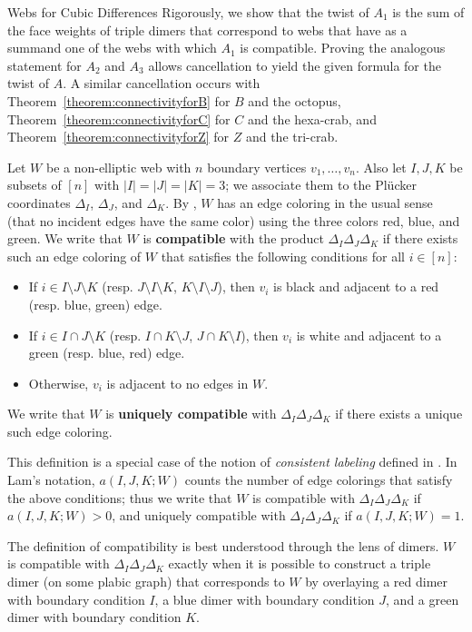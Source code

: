 \begin{subsection}{Webs for Cubic Differences}
Rigorously, we show that the twist of $A_1$ is the sum of the face weights of triple dimers that correspond to webs that have as a summand one of the webs with which $A_1$ is compatible. Proving the analogous statement for $A_2$ and $A_3$ allows cancellation to yield the given formula for the twist of $A$. A similar cancellation occurs with Theorem~\ref{theorem:connectivityforB} for $B$ and the octopus, Theorem~\ref{theorem:connectivityforC} for $C$ and the hexa-crab, and Theorem~\ref{theorem:connectivityforZ} for $Z$ and the tri-crab.

\begin{defi}
Let $W$ be a non-elliptic web with $n$ boundary vertices $v_1,\dots, v_n$. Also let $I,J,K$ be subsets of $[n]$ with $|I|=|J|=|K|=3$; we associate them to the Pl{\"u}cker coordinates $\Delta_I$, $\Delta_J$, and $\Delta_K$. By \cite[Lemma~4.11]{lam2015}, $W$ has an edge coloring in the usual sense (that no incident edges have the same color) using the three colors red, blue, and green. We write that $W$ is \textbf{compatible} with the product $\Delta_I\Delta_J\Delta_K$ if there exists such an edge coloring of $W$ that satisfies the following conditions for all $i \in [n]$:
\begin{itemize}
    \item If $i \in I\setminus J \setminus K$ (resp. $J\setminus I \setminus K$, $K\setminus I \setminus J$), then $v_i$ is black and adjacent to a red (resp. blue, green) edge.
    \item If $i \in I\cap J \setminus K$ (resp. $I\cap K \setminus J$, $J\cap K \setminus I$), then $v_i$ is white and adjacent to a green (resp. blue, red) edge.
    \item Otherwise, $v_i$ is adjacent to no edges in $W$.
\end{itemize}
We write that $W$ is \textbf{uniquely compatible} with $\Delta_I\Delta_J\Delta_K$ if there exists a unique such edge coloring. 
\end{defi}
\begin{rema}\label{rmk:aIJK}
This definition is a special case of the notion of \textit{consistent labeling} defined in \cite[Section 4.5]{lam2015}. In Lam's notation, $a(I,J,K;W)$ counts the number of edge colorings that satisfy the above conditions; thus we write that $W$ is compatible with $\Delta_I\Delta_J\Delta_K$ if $a(I,J,K;W) >0$, and uniquely compatible with $\Delta_I\Delta_J\Delta_K$ if $a(I,J,K;W) =1$.
\end{rema}
\begin{rema}
The definition of compatibility is best understood through the lens of dimers. $W$ is compatible with $\Delta_I\Delta_J\Delta_K$ exactly when it is possible to construct a triple dimer (on some plabic graph) that corresponds to $W$ by overlaying a red dimer with boundary condition $I$, a blue dimer with boundary condition $J$, and a green dimer with boundary condition $K$.
\end{rema}


\end{subsection}
